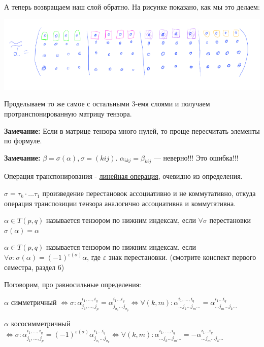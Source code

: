 А теперь возвращаем наш слой обратно. На рисунке показано, как мы это делаем:
 \begin{center}
         \includegraphics[width = 18cm]{assets/8_4-sample-4.png}
 \end{center}
Проделываем то же самое с остальными 3-емя слоями и получаем протранспонированную матрицу тензора.

\textbf{Замечание:} Если в матрице тензора много нулей, то проще пересчитать элементы по формуле.

\textbf{Замечание:} $\beta =\sigma(\alpha), \sigma = (kij)$. $\alpha_{ikj} = \beta_{kij}$ --- неверно!!! Это ошибка!!!

Операция транспонирования - \uline{линейная операция}, очевидно из определения.

$\sigma = \tau_k \cdot \ldots \tau_1$ произведение перестановок ассоциативно и не коммутативно, откуда операция транспозиции тензора аналогично ассоциативна и коммутативна.

 $\alpha \in T(p,q)$ называется  тензором по нижним индексам, если $\forall \sigma$ перестановки $\sigma(\alpha) = \alpha$

 $\alpha \in T(p,q)$ называется  тензором по нижним индексам, если $\forall \sigma: \sigma(\alpha) = (-1)^{\varepsilon(\sigma)
}\alpha$, где $\varepsilon$ знак перестановки. (смотрите конспект первого семестра, раздел 6)

Поговорим, про равносильные определения:

$\alpha$ симметричный $\Leftrightarrow \sigma: \alpha_{j_1,\ldots, j_p}^{i_1,\ldots, i_q} = \alpha_{j_{\sigma_1}\ldots j_{\sigma_p}}^{i_1 \ldots i_q} \Leftrightarrow \forall (k,m): \alpha_{\ldots j_k \ldots j_m \ldots}^{i_1,\ldots, i_q} = \alpha_{\ldots j_m \ldots j_k \ldots}^{i_1 \ldots i_q}$

$\alpha$ кососимметричный $\Leftrightarrow \sigma: \alpha_{j_1,\ldots, j_p}^{i_1,\ldots, i_q} = (-1)^{\varepsilon(\sigma)}\alpha_{j_{\sigma_1}\ldots j_{\sigma_p}}^{i_1 \ldots i_q} \Leftrightarrow \forall (k,m): \alpha_{\ldots j_k \ldots j_m \ldots}^{i_1,\ldots, i_q} = -\alpha_{\ldots j_m \ldots j_k \ldots}^{i_1 \ldots i_q}$

